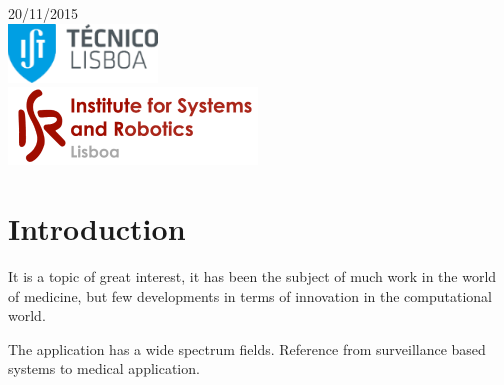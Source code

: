 \begin{titlepage}


{\large 20/11/2015}\\[2cm] %


\includegraphics{ist-logo.png}\\[0.5cm] %

\includegraphics{isr-logo.png}\\[0.5cm] %
 

\vfill %

\end{titlepage}

\section{Introduction}

It is a topic of great interest, it has been the subject of much work in the world of medicine, but few developments in terms of innovation in the computational world.

The application has a wide spectrum fields. Reference from surveillance based systems to medical application.

